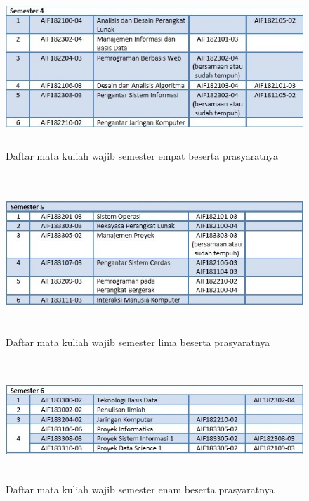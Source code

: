 \begin{figure}[H]
    \centering
    \includegraphics[width=12cm, height=6cm]{Gambar/Prasyarat MK Wajib Sem 4.jpg}
    \caption{Daftar mata kuliah wajib semester empat beserta prasyaratnya}
    \label{fig:gambarSem4}
\end{figure}

\begin{figure}[H]
    \centering
    \includegraphics[width=12cm, height=6cm]{Gambar/Prasyarat MK Wajib Sem 5.jpg}
    \caption{Daftar mata kuliah wajib semester lima beserta prasyaratnya}
    \label{fig:gambarSem5}
\end{figure}

\begin{figure}[H]
    \centering
    \includegraphics[width=12cm, height=4.5cm]{Gambar/Prasyarat MK Wajib Sem 6.jpg}
    \caption{Daftar mata kuliah wajib semester enam beserta prasyaratnya}
    \label{fig:gambarSem6}
\end{figure}

